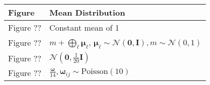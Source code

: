 \begin{tabular}{ll}
\toprule
Figure &                                                                                                                       Mean Distribution \\
\midrule
Figure ?? &                                                                                                                      Constant mean of 1 \\
Figure ?? &  $m + \bigoplus_\ell \boldsymbol{\mu}_\ell$, $\boldsymbol{\mu}_\ell \sim \mathcal{N}(\mathbf{0}, \mathbf{I}), m \sim \mathcal{N}(0, 1)$ \\
Figure ?? &                                                                                       $\mathcal{N}(\mathbf{0}, \frac{1}{20}\mathbf{I})$ \\
Figure ?? &                                                    $\frac{\boldsymbol{\omega}}{14}, \boldsymbol{\omega}_{ij} \sim \mathrm{Poisson}(10)$ \\
\bottomrule
\end{tabular}
